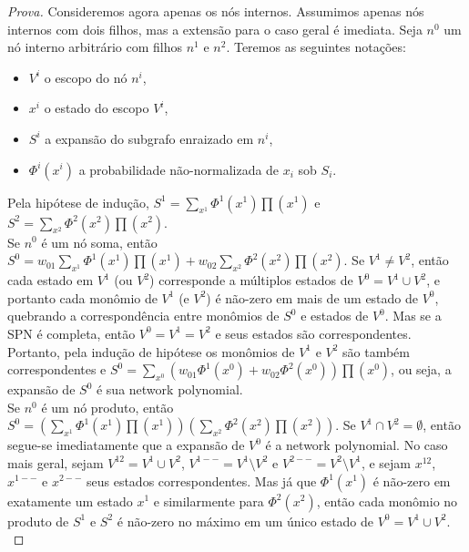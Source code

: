 \documentclass[a4paper,10pt]{article}
\theoremstyle{plain}
\begin{document}
\begin{proof}[Prova]
  Consideremos agora apenas os nós internos. Assumimos apenas nós internos com dois filhos, mas a
  extensão para o caso geral é imediata. Seja $n^0$ um nó interno arbitrário com filhos $n^1$ e
  $n^2$. Teremos as seguintes notações:

  \begin{itemize}
    \item $V^i$ o escopo do nó $n^i$,
    \item $x^i$ o estado do escopo $V^i$,
    \item $S^i$ a expansão do subgrafo enraizado em $n^i$,
    \item $\Phi^i(x^i)$ a probabilidade não-normalizada de $x_i$ sob $S_i$.
  \end{itemize}

  Pela hipótese de indução, $S^1=\sum_{x^1}\Phi^1(x^1)\prod(x^1)$ e  $S^2=\sum_{x^2}\Phi^2(x^2)
  \prod(x^2)$.\\

  Se $n^0$ é um nó soma, então $S^0=w_{01}\sum_{x^1}\Phi^1(x^1)\prod(x^1)+w_{02}\sum_{x^2}\Phi^2
  (x^2)\prod(x^2)$. Se $V^1 \neq V^2$, então cada estado em $V^1$ (ou $V^2$) corresponde a múltiplos
  estados de $V^0 = V^1 \cup V^2$, e portanto cada monômio de $V^1$ (e $V^2$) é não-zero em mais de
  um estado de $V^0$, quebrando a correspondência entre monômios de $S^0$ e estados de $V^0$. Mas
  se a SPN é completa, então $V^0 = V^1 = V^2$ e seus estados são correspondentes. Portanto, pela
  indução de hipótese os monômios de $V^1$ e $V^2$ são também correspondentes e $S^0=\sum_{x^0}
  (w_{01}\Phi^1(x^0)+w_{02}\Phi^2(x^0))\prod(x^0)$, ou seja, a expansão de $S^0$ é sua network
  polynomial.\\

  Se $n^0$ é um nó produto, então $S^0=(\sum_{x^1}\Phi^1(x^1)\prod(x^1))(\sum_{x^2}\Phi^2(x^2)\prod
  (x^2))$. Se $V^1 \cap V^2 = \emptyset$, então segue-se imediatamente que a expansão de $V^0$ é a
  network polynomial. No caso mais geral, sejam $V^{12}=V^1 \cup V^2$, $V^{1--}=V^1 \setminus V^2$
  e $V^{2--}=V^2 \setminus V^1$, e sejam $x^{12}$, $x^{1--}$ e $x^{2--}$ seus estados
  correspondentes. Mas já que $\Phi^1(x^1)$ é não-zero em exatamente um estado $x^1$ e similarmente
  para $\Phi^2(x^2)$, então cada monômio no produto de $S^1$ e $S^2$ é não-zero no máximo em um
  único estado de $V^0 = V^1 \cup V^2$.\\
\end{proof}

\newpage

\printbibliography
\end{document}
